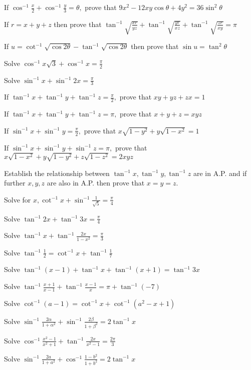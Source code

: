 \item If $\cos^{-1}\frac{x}{2}+ \cos^{-1}\frac{y}{3} = \theta,$ prove that $9x^2 - 12xy\cos\theta + 4y^2 =
    36\sin^2\theta$
\item If $r = x + y + z$ then prove that $\tan^{-1}\sqrt{\frac{xr}{yz}} + \tan^{-1}\sqrt{\frac{yr}{xz}} +
    \tan^{-1}\sqrt{\frac{zr}{xy}} = \pi$
\item If $u = \cot^{-1}\sqrt{\cos2\theta} - \tan^{-1}\sqrt{\cos2\theta}$ then prove that $\sin u = \tan^2\theta$
\item Solve $\cos^{-1}x\sqrt{3} + \cos^{-1}x = \frac{\pi}{2}$
\item Solve $\sin^{-1}x + \sin^{-1}2x = \frac{\pi}{3}$
\item If $\tan^{-1}x + \tan^{-1}y + \tan^{-1}z= \frac{\pi}{2},$ prove that $xy + yz + zx = 1$
\item If $\tan^{-1}x + \tan^{-1}y + \tan^{-1}z= \pi,$ prove that $x + y + z = xyz$
\item If $\sin^{-1}x + \sin^{-1}y = \frac{\pi}{2},$ prove that $x\sqrt{1 - y^2} + y\sqrt{1 - x^2} = 1$
\item If $\sin^{-1}x + \sin^{-1}y + \sin^{-1}z = \pi,$ prove that $x\sqrt{1 - x^2} + y\sqrt{1 - y^2} + z\sqrt{1 - z^2} =
    2xyz$
\item Establish the relationship between $\tan^{-1}x, \tan^{-1}y, \tan^{-1}z$ are in A.P. and if further $x, y, z$ are
    also in A.P. then prove that $x = y = z.$
\item Solve for $x, \cot^{-1}x + \sin^{-1}\frac{1}{\sqrt{5}} = \frac{\pi}{4}$
\item Solve $\tan^{-1}2x + \tan^{-1}3x = \frac{\pi}{4}$
\item Solve $\tan^{-1} x + \tan^{-1}\frac{2x}{1 - x^2} = \frac{\pi}{3}$
\item Solve $\tan^{-1}\frac{1}{2} = \cot^{-1}x + \tan^{-1}\frac{1}{7}$
\item Solve $\tan^{-1}(x - 1) + \tan^{-1}x + \tan^{-1}(x + 1) = \tan^{-1}3x$
\item Solve $\tan^{-1}\frac{x + 1}{x - 1} + \tan^{-1}\frac{x - 1}{x} = \pi + \tan^{-1}(-7)$
\item Solve $\cot^{-1}(a - 1) = \cot^{-1}x + \cot^{-1}(a^2 - x + 1)$
\item Solve $\sin^{-1}\frac{2\alpha}{1 + \alpha^2} + \sin^{-1}\frac{2\beta}{1 + \beta^2} = 2\tan^{-1}x$
\item Solve $\cos^{-1}\frac{x^2 - 1}{x^2 + 1} + \tan^{-1}\frac{2x}{x^2 - 1} = \frac{2\pi}{3}$
\item Solve $\sin^{-1}\frac{2a}{1 + a^2} + \cos^{-1}\frac{1 - b^2}{1 + b^2} = 2\tan^{-1}x$
